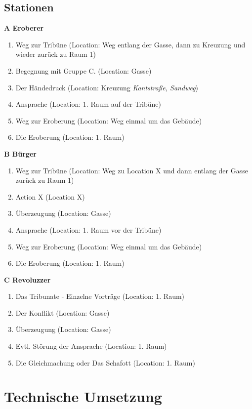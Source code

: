 \documentclass[a4paper, 12pt]{article}
\begin{document}
\subsection{Stationen}
\textbf{A Eroberer}
\begin{enumerate}
    \item Weg zur Tribüne (Location: Weg entlang der Gasse, dann zu Kreuzung und wieder zurück zu Raum 1)
    \item Begegnung mit Gruppe C. (Location: Gasse)
    \item Der Händedruck (Location: Kreuzung \textit{Kantstraße, Sandweg})
    \item Ansprache (Location: 1. Raum auf der Tribüne)
    \item Weg zur Eroberung (Location: Weg einmal um das Gebäude)
    \item Die Eroberung (Location: 1. Raum)
\end{enumerate}
\textbf{B Bürger}
\begin{enumerate}
    \item Weg zur Tribüne (Location: Weg zu Location X und dann entlang der Gasse zurück zu Raum 1)
    \item Action X (Location X)
    \item Überzeugung (Location: Gasse)
    \item Ansprache (Location: 1. Raum vor der Tribüne)
    \item Weg zur Eroberung (Location: Weg einmal um das Gebäude)
    \item Die Eroberung (Location: 1. Raum)
\end{enumerate}
\textbf{C Revoluzzer}
\begin{enumerate}
    \item Das Tribunate - Einzelne Vorträge (Location: 1. Raum)
    \item Der Konflikt (Location: Gasse)
    \item Überzeugung (Location: Gasse)
    \item Evtl. Störung der Ansprache (Location: 1. Raum)
    \item Die Gleichmachung oder Das Schafott  (Location: 1. Raum)
\end{enumerate}
\section{Technische Umsetzung}\label{technische_umsetzung}
   
\printbibliography

\listoftodos
 
\end{document}
